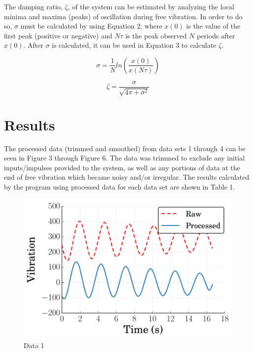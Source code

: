\documentclass[11pt]{article}
\begin{document}
\bigskip

The damping ratio, $\zeta$, of the system can be estimated by analyzing the local minima and maxima (peaks) of oscillation during free vibration. In order to do so, $\sigma$ must be calculated by using Equation 2, where $x(0)$ is the value of the first peak (positive or negative) and $N\tau$ is the peak observed $N$ periods after $x(0)$. After $\sigma$ is calculated, it can be used in Equation 3 to calculate $\zeta$. 

\begin{equation}
\sigma = \frac{1}{N}ln\left(\frac{x(0)}{x(N\tau)}\right)
\label{eqn:example2}
\end{equation}

\bigskip

\begin{equation}
\zeta = \frac{\sigma}{\sqrt{4\pi+\sigma^2}}
\label{eqn:example2}
\end{equation}



\section{Results}
\label{sec:section_2_label}
\vspace{-0.2in}
%

The processed data (trimmed and smoothed) from data sets 1 through 4 can be seen in Figure 3 through Figure 6. The data was trimmed to exclude any initial inputs/impulses provided to the system, as well as any portions of data at the end of free vibration which became noisy and/or irregular. The results calculated by the program using processed data for each data set are shown in Table 1. 

\newpage

\begin{figure}[h!] %
   \centering
   \includegraphics[width=5in]{vibration_data1.pdf} 
   \caption{Data 1}
   \label{fig:example}
\end{figure}
\end{document}

